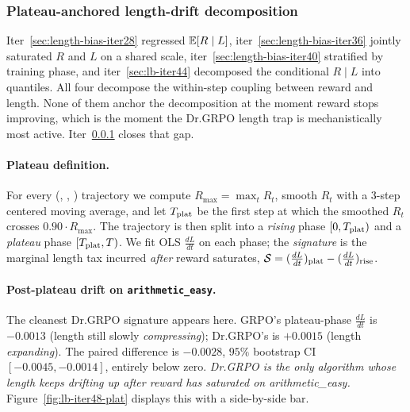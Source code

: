 
\subsubsection{Plateau-anchored length-drift decomposition}\label{sec:lb-iter48}

Iter~\ref{sec:length-bias-iter28} regressed $\mathbb{E}[R\mid L]$, iter~\ref{sec:length-bias-iter36}
jointly saturated $R$ and $L$ on a shared scale, iter~\ref{sec:length-bias-iter40}
stratified by training phase, and iter~\ref{sec:lb-iter44} decomposed the
conditional $R\mid L$ into quantiles. All four decompose the within-step
coupling between reward and length. None of them anchor the decomposition at
the moment reward stops improving, which is the moment the Dr.GRPO length
trap is mechanistically most active. Iter~\ref{sec:lb-iter48} closes that gap.

\paragraph{Plateau definition.}
For every (\task, \algo, \seed) trajectory we compute
$R_{\max} = \max_t R_t$, smooth $R_t$ with a 3-step centered moving average,
and let $T_{\text{plat}}$ be the first step at which the smoothed $R_t$ crosses
$0.90 \cdot R_{\max}$. The trajectory is then split into a \emph{rising}
phase $[0, T_{\text{plat}})$ and a \emph{plateau} phase $[T_{\text{plat}}, T)$. We fit OLS
$\frac{dL}{dt}$ on each phase; the \emph{signature} is the marginal length
tax incurred \emph{after} reward saturates,
$\mathcal{S} = (\tfrac{dL}{dt})_{\text{plat}} - (\tfrac{dL}{dt})_{\text{rise}}$.

\paragraph{Post-plateau drift on \texttt{arithmetic\_easy}.}
The cleanest Dr.GRPO signature appears here. GRPO's plateau-phase
$\tfrac{dL}{dt}$ is $-0.0013$ (length still slowly \emph{compressing}); Dr.GRPO's
is $+0.0015$ (length \emph{expanding}). The paired difference is
$-0.0028$, $95\%$ bootstrap CI $[-0.0045, -0.0014]$, entirely below zero.
\emph{Dr.GRPO is the only algorithm whose length keeps drifting up after
reward has saturated on arithmetic\_easy.} Figure~\ref{fig:lb-iter48-plat}
displays this with a side-by-side bar.

